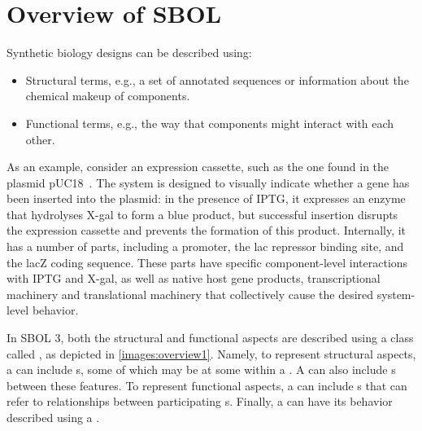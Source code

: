 \section{Overview of SBOL}

Synthetic biology designs can be described using:
\begin{itemize}
\item Structural terms, e.g., a set of annotated sequences or information about the chemical makeup of components.
\item Functional terms, e.g., the way that components might interact with each other. 
\end{itemize}

As an example, consider an expression cassette, such as the one found in the plasmid pUC18~\cite{L08752.1}.
The system is designed to visually indicate whether a gene has been inserted into the plasmid: 
in the presence of IPTG, it expresses an enzyme that hydrolyses X-gal to form a blue product, but successful insertion disrupts the expression cassette and prevents the formation of this product. 
Internally, it has a number of parts, including a promoter, the lac repressor binding site, and the lacZ coding sequence.
These parts have specific component-level interactions with IPTG and X-gal, as well as native host gene products, transcriptional machinery and translational machinery that collectively cause the desired system-level behavior.

In SBOL 3, both the structural and functional aspects are described using a class called , as depicted in \ref{images:overview1}.  
Namely, to represent structural aspects, a  can include s, some of which may be at some  within a .  
A  can also include s between these features.  
To represent functional aspects, a  can include s that can refer to relationships between participating s.  
Finally, a  can have its behavior described using a .

